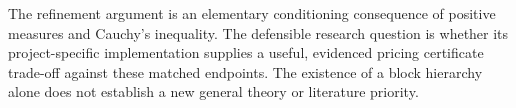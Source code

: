 The refinement argument is an elementary conditioning consequence of
positive measures and Cauchy's inequality. The defensible research
question is whether its project-specific implementation supplies a
useful, evidenced pricing certificate trade-off against these matched
endpoints. The existence of a block hierarchy alone does not establish
a new general theory or literature priority.
